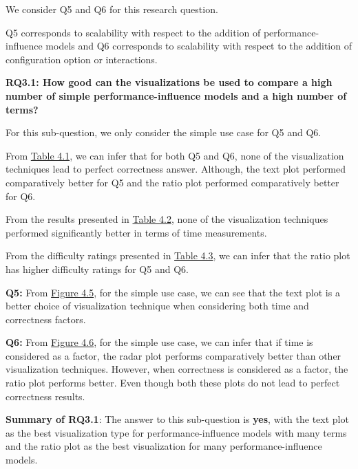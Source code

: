 We consider Q5 and Q6 for this research question.

Q5 corresponds to scalability with respect to the addition of performance-influence models and Q6 corresponds to scalability with respect to the addition of configuration option or interactions.

\begin{mdframed} 
\textbf{RQ3.1: How good can the visualizations be used to compare a high number of simple performance-influence models and a high number of terms?}
\end{mdframed}

For this sub-question, we only consider the simple use case for Q5 and Q6.

\begin{description}[leftmargin=0pt]
\item[Correctness: ] From \hyperref[table:correctness]{Table 4.1}, we can infer that for both Q5 and Q6, none of the visualization techniques lead to perfect correctness answer. Although, the text plot performed comparatively better for Q5 and the ratio plot performed comparatively better for Q6.

\item[Time Measurements: ] From the results presented in \hyperref[table:time]{Table 4.2}, none of the visualization techniques performed significantly better in terms of time measurements.

\item[Difficulty Ratings: ] From the difficulty ratings presented in \hyperref[table:rating]{Table 4.3}, we can infer that the ratio plot has higher difficulty ratings for Q5 and Q6.

\end{description}

\textbf{Q5:} From \hyperref[figure:paretoManyQ5]{Figure 4.5}, for the simple use case, we can see that the text plot is a better choice of visualization technique when considering both time and correctness factors.

\textbf{Q6:} From \hyperref[figure:paretoManyQ6]{Figure 4.6}, for the simple use case, we can infer that if time is considered as a factor, the radar plot performs comparatively better than other visualization techniques. However, when correctness is considered as a factor, the ratio plot performs better. Even though both these plots do not lead to perfect correctness results.

\textbf{Summary of RQ3.1}: The answer to this sub-question is \textbf{yes}, with the text plot as the best visualization type for performance-influence models with many terms and the ratio plot as the best visualization for many performance-influence models.


